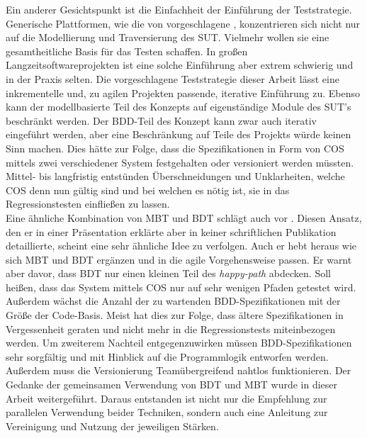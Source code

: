 Ein anderer Gesichtspunkt ist die Einfachheit der Einführung der Teststrategie. Generische Plattformen, wie die von \citeauthor{zech_generic_2012} vorgeschlagene \cite{zech_generic_2012}, konzentrieren sich nicht nur auf die Modellierung und Traversierung des \Gls{SUT}. Vielmehr wollen sie eine gesamtheitliche Basis für das Testen schaffen. In großen Langzeitsoftwareprojekten ist eine solche Einführung aber extrem schwierig und in der Praxis selten. Die vorgeschlagene Teststrategie dieser Arbeit lässt eine inkrementelle und, zu agilen Projekten passende, iterative Einführung zu. Ebenso kann der modellbasierte Teil des Konzepts auf eigenständige Module des \Gls{SUT}'s beschränkt werden. Der BDD-Teil des Konzept kann zwar auch iterativ eingeführt werden, aber eine Beschränkung auf Teile des Projekts würde keinen Sinn machen. Dies hätte zur Folge, dass die Spezifikationen in Form von \Gls{COS} mittels zwei verschiedener System festgehalten oder versioniert werden müssten. Mittel- bis langfristig entstünden Überschneidungen und Unklarheiten, welche \Gls{COS} denn nun gültig sind und bei welchen es nötig ist, sie in das Regressionstesten einfließen zu lassen.\\
Eine ähnliche Kombination von \Gls{MBT} und \Gls{BDT} schlägt auch \citeauthor{binder_model-based_2014} vor \cite{binder_model-based_2014}. Diesen Ansatz, den er in einer Präsentation \cite{binder_model-based_2014} erklärte aber in keiner schriftlichen Publikation detaillierte, scheint eine sehr ähnliche Idee zu verfolgen. Auch er hebt heraus wie sich \Gls{MBT} und \Gls{BDT} ergänzen und in die agile Vorgehensweise passen. Er warnt aber davor, dass \Gls{BDT} nur einen kleinen Teil des \textit{happy-path} abdecken. Soll heißen, dass das System mittels \Gls{COS} nur auf sehr wenigen Pfaden getestet wird. Außerdem wächst die Anzahl der zu wartenden \Gls{BDD}-Spezifikationen mit der Größe der Code-Basis. Meist hat dies zur Folge, dass ältere Spezifikationen in Vergessenheit geraten und nicht mehr in die Regressionstests miteinbezogen werden. Um zweiterem Nachteil entgegenzuwirken müssen \Gls{BDD}-Spezifikationen sehr sorgfältig und mit Hinblick auf die Programmlogik entworfen werden. Außerdem muss die Versionierung Teamübergreifend nahtlos funktionieren. Der Gedanke der gemeinsamen Verwendung von \Gls{BDT} und \Gls{MBT} wurde in dieser Arbeit weitergeführt. Daraus entstanden ist nicht nur die Empfehlung zur parallelen Verwendung beider Techniken, sondern auch eine Anleitung zur Vereinigung und Nutzung der jeweiligen Stärken. \\
